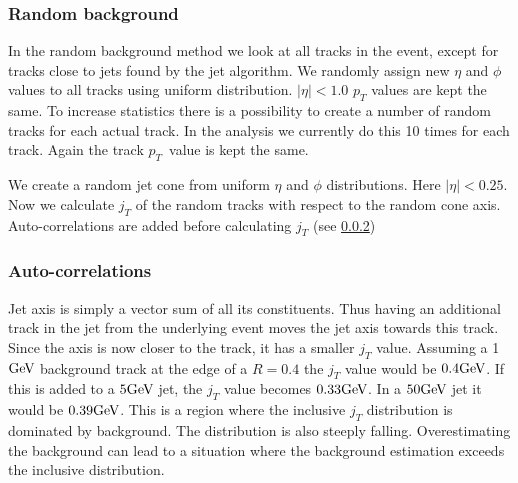 


\subsubsection{Random background}
In the random background method we look at all tracks in the event, except for tracks close to jets found by the jet algorithm. We randomly assign new $\eta$ and $\phi$ values to all tracks using uniform distribution. $\left|\eta\right| < 1.0$ $p_T$ values are kept the same. To increase statistics there is a possibility to create a number of random tracks for each actual track. In the analysis we currently do this 10 times for each track. Again the track $p_T$ value is kept the same. 

We create a random jet cone from uniform $\eta$ and $\phi$ distributions. Here $\left| \eta \right| < 0.25$. Now we calculate $j_T$ of the random tracks with respect to the random cone axis. Auto-correlations are added before calculating $j_T$ (see \ref{sec:autoC})
\subsubsection{Auto-correlations}
\label{sec:autoC}
Jet axis is simply a vector sum of all its constituents. Thus having an additional track in the jet from the underlying event moves the jet axis towards this track. Since the axis is now closer to the track, it has a smaller $j_T$ value. Assuming a 1 $\mathrm{GeV}\kern-0.05em$ background track  at the edge of a $R = 0.4$ the $j_T$ value would be $0.4\mathrm{GeV}\kern-0.05em$. If this is added to a $5\mathrm{GeV}\kern-0.05em$ jet, the $j_T$ value becomes $0.33\mathrm{GeV}\kern-0.05em$. In a $50\mathrm{GeV}\kern-0.05em$ jet it would be $0.39\mathrm{GeV}\kern-0.05em$. This is a region where the inclusive $j_T$ distribution is dominated by background. The distribution is also steeply falling. Overestimating the background can lead to a situation where the background estimation exceeds the inclusive distribution.

